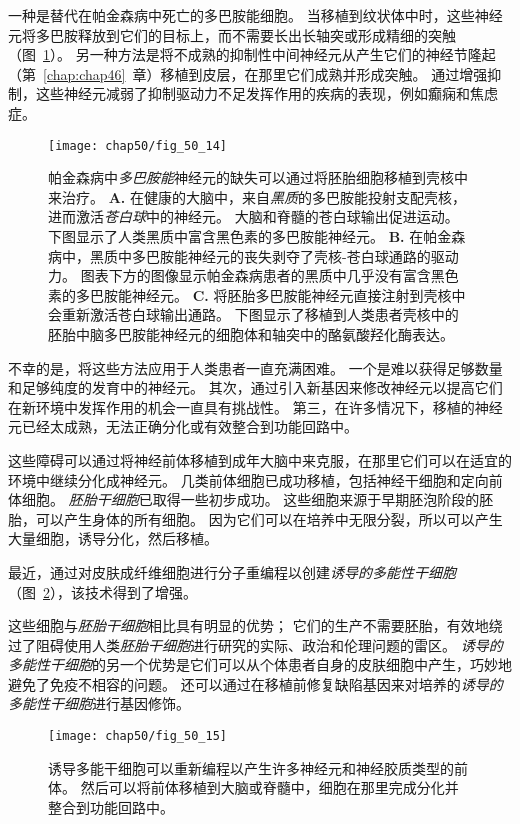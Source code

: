 一种是替代在帕金森病中死亡的多巴胺能细胞。
当移植到纹状体中时，这些神经元将多巴胺释放到它们的目标上，而不需要长出长轴突或形成精细的突触（图~\ref{fig:50_14}）。
另一种方法是将不成熟的抑制性中间神经元从产生它们的神经节隆起（第~\ref{chap:chap46}~章）移植到皮层，在那里它们成熟并形成突触。
通过增强抑制，这些神经元减弱了抑制驱动力不足发挥作用的疾病的表现，例如癫痫和焦虑症。


\begin{figure}[htbp]
	\centering
	\texttt{[image: chap50/fig\_50\_14]}
	\caption{帕金森病中\textit{多巴胺能}神经元的缺失可以通过将胚胎细胞移植到壳核中来治疗。
		\textbf{A.} 在健康的大脑中，来自\textit{黑质}的多巴胺能投射支配壳核，进而激活\textit{苍白球}中的神经元。
		大脑和脊髓的苍白球输出促进运动。
		下图显示了人类黑质中富含黑色素的多巴胺能神经元。
		\textbf{B.} 在帕金森病中，黑质中多巴胺能神经元的丧失剥夺了壳核-苍白球通路的驱动力。
		图表下方的图像显示帕金森病患者的黑质中几乎没有富含黑色素的多巴胺能神经元。
		\textbf{C.} 将胚胎多巴胺能神经元直接注射到壳核中会重新激活苍白球输出通路。
		下图显示了移植到人类患者壳核中的胚胎中脑多巴胺能神经元的细胞体和轴突中的酪氨酸羟化酶表达\cite{kordower2000neuropathology}。}
	\label{fig:50_14}
\end{figure}


不幸的是，将这些方法应用于人类患者一直充满困难。
一个是难以获得足够数量和足够纯度的发育中的神经元。
其次，通过引入新基因来修改神经元以提高它们在新环境中发挥作用的机会一直具有挑战性。
第三，在许多情况下，移植的神经元已经太成熟，无法正确分化或有效整合到功能回路中。


这些障碍可以通过将神经前体移植到成年大脑中来克服，在那里它们可以在适宜的环境中继续分化成神经元。
几类前体细胞已成功移植，包括神经干细胞和定向前体细胞。
\textit{胚胎干细胞}已取得一些初步成功。
这些细胞来源于早期胚泡阶段的胚胎，可以产生身体的所有细胞。
因为它们可以在培养中无限分裂，所以可以产生大量细胞，诱导分化，然后移植。


最近，通过对皮肤成纤维细胞进行分子重编程以创建\textit{诱导的多能性干细胞}（图~\ref{fig:50_15}），该技术得到了增强。

这些细胞与\textit{胚胎干细胞}相比具有明显的优势；
它们的生产不需要胚胎，有效地绕过了阻碍使用人类\textit{胚胎干细胞}进行研究的实际、政治和伦理问题的雷区。
\textit{诱导的多能性干细胞}的另一个优势是它们可以从个体患者自身的皮肤细胞中产生，巧妙地避免了免疫不相容的问题。
还可以通过在移植前修复缺陷基因来对培养的\textit{诱导的多能性干细胞}进行基因修饰。


\begin{figure}[htbp]
	\centering
	\texttt{[image: chap50/fig\_50\_15]}
	\caption{诱导多能干细胞可以重新编程以产生许多神经元和神经胶质类型的前体。
		然后可以将前体移植到大脑或脊髓中，细胞在那里完成分化并整合到功能回路中\cite{wen2016modeling}。}
	\label{fig:50_15}
\end{figure}



